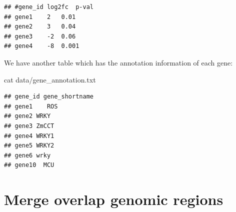 \documentclass[]{book}
\makeatletter
\newenvironment{Shaded}{\begin{snugshade}}{\end{snugshade}}
\newcommand{\FunctionTok}[1]{\textcolor[rgb]{0.00,0.00,0.00}{#1}}
\newcommand{\NormalTok}[1]{#1}
\newenvironment{kframe}{%
\medskip{}
\setlength{\fboxsep}{.8em}
 \def\at@end@of@kframe{}%
 \ifinner\ifhmode%
  \def\at@end@of@kframe{\end{minipage}}%
  \begin{minipage}{\columnwidth}%
 \fi\fi%
 \def\FrameCommand##1{\hskip\@totalleftmargin \hskip-\fboxsep
 \colorbox{shadecolor}{##1}\hskip-\fboxsep
     \hskip-\linewidth \hskip-\@totalleftmargin \hskip\columnwidth}%
 \MakeFramed {\advance\hsize-\width
   \@totalleftmargin\z@ \linewidth\hsize
   \@setminipage}}%
 {\par\unskip\endMakeFramed%
 \at@end@of@kframe}
\renewenvironment{Shaded}{\begin{kframe}}{\end{kframe}}
\makeatother
\begin{document}
\begin{verbatim}
## #gene_id log2fc  p-val
## gene1    2   0.01
## gene2    3   0.04
## gene3    -2  0.06
## gene4    -8  0.001
\end{verbatim}

We have another table which has the annotation information of each gene:

\begin{Shaded}
\begin{Highlighting}[]
\FunctionTok{cat}\NormalTok{ data/gene_annotation.txt}
\end{Highlighting}
\end{Shaded}

\begin{verbatim}
## gene_id gene_shortname
## gene1    ROS
## gene2 WRKY
## gene3 ZmCCT
## gene4 WRKY1
## gene5 WRKY2
## gene6 wrky
## gene10  MCU
\end{verbatim}

\hypertarget{merge-overlap-genomic-regions}{%
\section{Merge overlap genomic regions}\label{merge-overlap-genomic-regions}}
\end{document}
